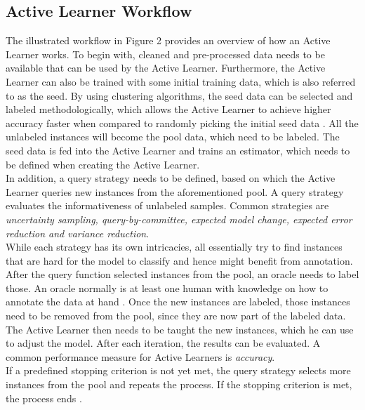 \documentclass[11pt, a4paper]{article}
\begin{document}
\subsection{Active Learner Workflow} \label{subs:activelearnerworkflow}
The illustrated workflow in Figure 2 provides an overview of how an Active Learner works. 
To begin with, cleaned and pre-processed data needs to be available that can be used by the Active Learner. 
Furthermore, the Active Learner can also be trained with some initial training data, which is also referred to as the seed. 
By using clustering algorithms, the seed data can be selected and labeled methodologically, which allows the Active Learner to achieve 
higher accuracy faster when compared to randomly picking the initial seed data \citep{kang2004usingclusterbasedsampling}. All the unlabeled 
instances will become the pool data, which need to be labeled. The seed data is fed into the Active Learner and trains an estimator, 
which needs to be defined when creating the Active Learner.\\
In addition, a query strategy needs to be defined, based on which the Active Learner queries new instances from the aforementioned pool. 
A query strategy evaluates the informativeness of unlabeled samples. Common strategies are \emph{uncertainty sampling, query-by-committee, 
expected model change, expected error reduction and variance reduction}. \\
While each strategy has its own intricacies, all essentially try to find instances that are hard for the model to classify and hence might benefit from annotation. 
After the query function selected instances from the pool, an oracle needs to label those. An oracle normally is at 
least one human with knowledge on how to annotate the data at hand \citep{settles2009activeLL}. Once the new instances are labeled, 
those instances need to be removed from the pool, since they are now part of the labeled data. The Active Learner then needs 
to be taught the new instances, which he can use to adjust the model. After each iteration, the results can be evaluated. 
A common performance measure for Active Learners is \emph{accuracy}.\\
If a predefined stopping criterion is not yet met, the query strategy selects more instances from the pool and repeats the process.
If the stopping criterion is met, the process ends \citep{lu2019investigating}.
\end{document}
